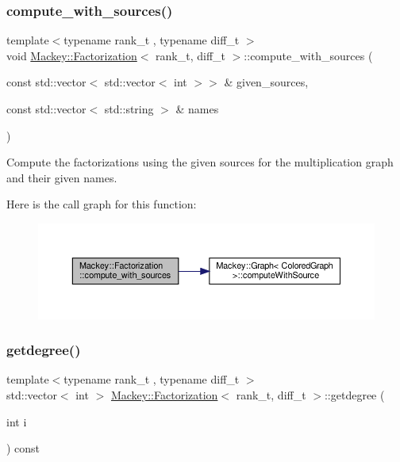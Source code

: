 \subsubsection{\texorpdfstring{compute\+\_\+with\+\_\+sources()}{compute\_with\_sources()}}
{\footnotesize\ttfamily template$<$typename rank\+\_\+t , typename diff\+\_\+t $>$ \\
void \hyperlink{classMackey_1_1Factorization}{Mackey\+::\+Factorization}$<$ rank\+\_\+t, diff\+\_\+t $>$\+::compute\+\_\+with\+\_\+sources (\begin{DoxyParamCaption}\item[{const std\+::vector$<$ std\+::vector$<$ int $>$$>$ \&}]{given\+\_\+sources,  }\item[{const std\+::vector$<$ std\+::string $>$ \&}]{names }\end{DoxyParamCaption})}



Compute the factorizations using the given sources for the multiplication graph and their given names. 

Here is the call graph for this function\+:\nopagebreak
\begin{figure}[H]
\begin{center}
\leavevmode
\includegraphics[width=350pt]{classMackey_1_1Factorization_a2e135a37687fc3d69cd16a8729dd19eb_cgraph}
\end{center}
\end{figure}
\mbox{\label{classMackey_1_1Factorization_aef67e1ba1bf216416d0ec9923ff90b0d}} 
\subsubsection{\texorpdfstring{getdegree()}{getdegree()}}
{\footnotesize\ttfamily template$<$typename rank\+\_\+t , typename diff\+\_\+t $>$ \\
std\+::vector$<$ int $>$ \hyperlink{classMackey_1_1Factorization}{Mackey\+::\+Factorization}$<$ rank\+\_\+t, diff\+\_\+t $>$\+::getdegree (\begin{DoxyParamCaption}\item[{int}]{i }\end{DoxyParamCaption}) const\hspace{0.3cm}{\ttfamily [inline]}}



